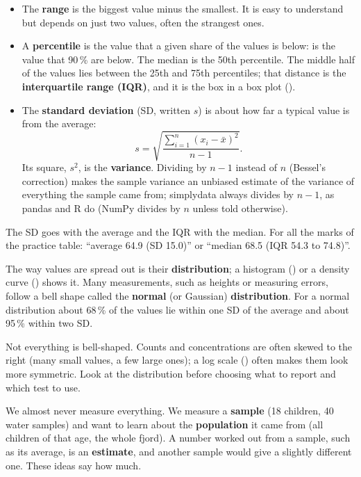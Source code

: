 \begin{itemize}
  \item The \textbf{range} is the biggest value minus the smallest. It is easy to understand but
    depends on just two values, often the strangest ones.
  \item A \textbf{percentile} is the value that a given share of the values is below:
     is the value that 90\,\% are below. The median is the 50th
    percentile. The middle half of the values lies between the 25th and 75th percentiles; that
    distance is the \textbf{interquartile range (IQR)}, and it is the box in a box plot
    ().
  \item The \textbf{standard deviation} (SD, written $s$) is about how far a typical value is from
    the average:
    \[
      s = \sqrt{\frac{\sum_{i=1}^{n} (x_i - \bar{x})^2}{n - 1}}.
    \]
    Its square, $s^2$, is the \textbf{variance}. Dividing by $n-1$ instead of $n$ (Bessel's
    correction) makes the sample variance an unbiased estimate of the variance of everything the
    sample came from; simplydata always divides by $n-1$, as pandas and R do (NumPy divides by $n$
    unless told otherwise).
\end{itemize}

The SD goes with the average and the IQR with the median. For all the marks of the practice table:
``average 64.9 (SD 15.0)'' or ``median 68.5 (IQR 54.3 to 74.8)''.


The way values are spread out is their \textbf{distribution}; a histogram
() or a density curve () shows it. Many measurements,
such as heights or measuring errors, follow a bell shape called the \textbf{normal} (or
Gaussian) \textbf{distribution}. For a normal distribution about 68\,\% of the values lie within
one SD of the average and about 95\,\% within two SD.

Not everything is bell-shaped. Counts and concentrations are often skewed to the right (many
small values, a few large ones); a log scale () often makes them look
more symmetric. Look at the distribution before choosing what to report and which test to use.


We almost never measure everything. We measure a \textbf{sample} (18 children, 40 water samples)
and want to learn about the \textbf{population} it came from (all children of that age, the whole
fjord). A number worked out from a sample, such as its average, is an \textbf{estimate}, and
another sample would give a slightly different one. These ideas say how much.

